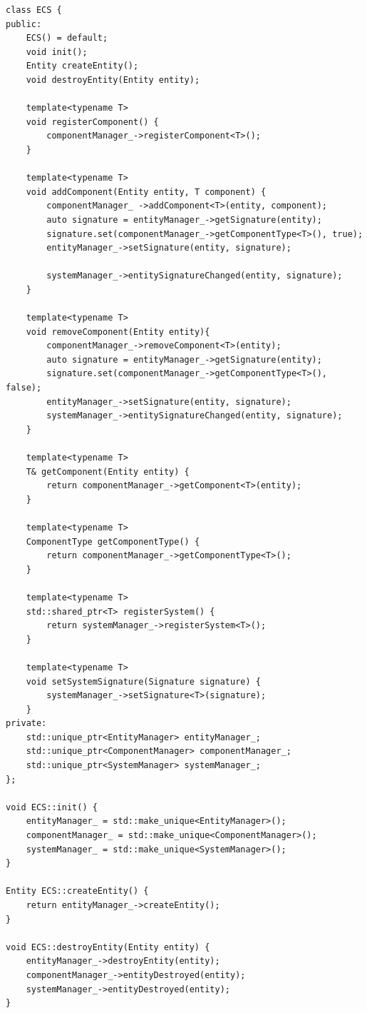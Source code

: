 \begin{lstlisting}
class ECS {
public:
    ECS() = default;
    void init();
    Entity createEntity();
    void destroyEntity(Entity entity);

    template<typename T>
    void registerComponent() {
        componentManager_->registerComponent<T>();
    }

    template<typename T>
    void addComponent(Entity entity, T component) {
        componentManager_ ->addComponent<T>(entity, component);
        auto signature = entityManager_->getSignature(entity);
        signature.set(componentManager_->getComponentType<T>(), true);
        entityManager_->setSignature(entity, signature);

        systemManager_->entitySignatureChanged(entity, signature);
    }

    template<typename T>
    void removeComponent(Entity entity){
        componentManager_->removeComponent<T>(entity);
        auto signature = entityManager_->getSignature(entity);
        signature.set(componentManager_->getComponentType<T>(), false);
        entityManager_->setSignature(entity, signature);
        systemManager_->entitySignatureChanged(entity, signature);
    }

    template<typename T>
    T& getComponent(Entity entity) {
        return componentManager_->getComponent<T>(entity);
    }

    template<typename T>
    ComponentType getComponentType() {
        return componentManager_->getComponentType<T>();
    }

    template<typename T>
    std::shared_ptr<T> registerSystem() {
        return systemManager_->registerSystem<T>();
    }

    template<typename T>
    void setSystemSignature(Signature signature) {
        systemManager_->setSignature<T>(signature);
    }
private:
    std::unique_ptr<EntityManager> entityManager_;
    std::unique_ptr<ComponentManager> componentManager_;
    std::unique_ptr<SystemManager> systemManager_;
};

void ECS::init() {
    entityManager_ = std::make_unique<EntityManager>();
    componentManager_ = std::make_unique<ComponentManager>();
    systemManager_ = std::make_unique<SystemManager>();
}

Entity ECS::createEntity() {
    return entityManager_->createEntity();
}

void ECS::destroyEntity(Entity entity) {
    entityManager_->destroyEntity(entity);
    componentManager_->entityDestroyed(entity);
    systemManager_->entityDestroyed(entity);
}
\end{lstlisting}

